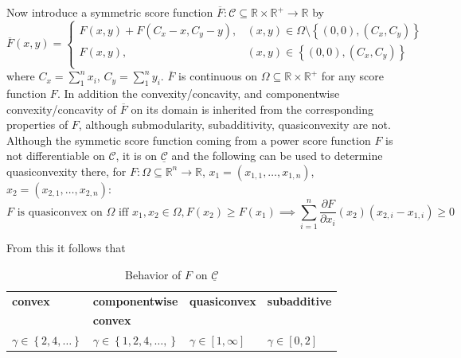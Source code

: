 \documentclass{article}
\theoremstyle{case}
\begin{document}
Now introduce a symmetric score function $\overline{F}\colon \mathcal{C} \subseteq \mathbb{R} \times \mathbb{R}^{+} \to \mathbb{R}$ by
\[   
\overline{F}\left( x,y\right) = \left\{
\begin{array}{ll}
      F\left( x,y\right) + F\left( C_x-x, C_y-y\right), & \left( x,y\right) \in \Omega \setminus{\left\lbrace \left( 0,0\right), \left( C_x, C_y\right) \right\rbrace}  \\
      F\left( x,y\right), & \left( x,y\right) \in \left\lbrace \left( 0,0\right), \left( C_x, C_y\right) \right\rbrace  \\
\end{array} 
\right. 
\]
where $C_x = \sum_1^n x_i$, $C_y = \sum_1^n y_i$. $\overline{F}$ is continuous on $\Omega \subseteq \mathbb{R} \times \mathbb{R}^{+}$ for any score function $F$. In addition the convexity/concavity, and componentwise convexity/concavity of $\overline{F}$ on its domain is inherited from the corresponding properties of $F$, although submodularity, subadditivity, quasiconvexity are not. Although the symmetic score function coming from a power score function $F$ is not differentiable on $\mathcal{C}$, it is on $\underline{\mathcal{C}}$ and the following can be used to determine quasiconvexity there, for $F\colon \Omega \subseteq \mathbb{R}^n \rightarrow \mathbb{R}$, $x_1 = \left( x_{1,1}, \dots, x_{1,n}\right)$, $x_2 = \left( x_{2,1}, \dots, x_{2,n}\right)$:
\[
F\text{ is quasiconvex on } \Omega \text{ iff } x_1, x_2 \in \Omega, F(x_2) \geq F(x_1) \implies \sum_{i=1}^{n}\frac{\partial F}{\partial x_i}\left( x_2\right)\left( x_{2,i} - x_{1,i}\right) \geq 0
\]

From this it follows that 
\label{tab:tab0}
\begin{table}
\begin{center}
\caption{Behavior of $F \text{ on } \underline{\mathcal{C}}$}
  \begin{tabular}{l|l|l|l}
    \textbf{convex} & \textbf{componentwise} & \textbf{quasiconvex} & \textbf{subadditive}\\
     & \textbf{convex} & \\
    \hline
	 $\gamma \in \left\lbrace 2, 4, \dots \right\rbrace$ & $\gamma \in \left\lbrace 1, 2, 4, \dots, \right\rbrace$ & $\gamma \in \left[1, \infty\right]$ & $\gamma \in \left[ 0,2 \right]$\\    
  \end{tabular}
\end{center}
\end{table}
\end{document}
